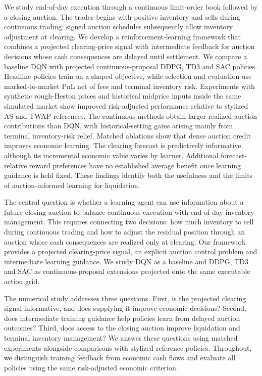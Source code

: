We study end-of-day execution through a continuous limit-order book followed
by a closing auction. The trader begins with positive inventory and sells
during continuous trading; signed auction schedules subsequently allow
inventory adjustment at clearing. We develop a reinforcement-learning framework
that combines a projected clearing-price signal with intermediate feedback
for auction decisions whose cash consequences are delayed until settlement.
We compare a baseline DQN with projected continuous-proposal DDPG, TD3 and SAC
policies. Headline policies train on a shaped objective, while selection and
evaluation use marked-to-market PnL net of fees and terminal inventory risk.
Experiments with synthetic rough-Heston prices and historical midprice inputs
inside the same simulated market show improved risk-adjusted performance
relative to stylized AS and TWAP references. The continuous methods obtain
larger realized auction contributions than DQN, with historical-setting gains
arising mainly from terminal inventory-risk relief. Matched ablations show
that dense auction credit improves economic learning. The clearing forecast
is predictively informative, although its incremental economic value varies
by learner. Additional forecast-relative reward preferences have no established
average benefit once learning guidance is held fixed. These findings identify
both the usefulness and the limits of auction-informed learning for liquidation.

The central question is whether a learning agent can use information about a
future closing auction to balance continuous execution with end-of-day inventory
management. This requires connecting two decisions: how much inventory to sell
during continuous trading and how to adjust the residual position through an
auction whose cash consequences are realized only at clearing. Our framework
provides a projected clearing-price signal, an explicit auction control problem
and intermediate learning guidance. We study DQN as a baseline and DDPG, TD3
and SAC as continuous-proposal extensions projected onto the same executable
action grid.

The numerical study addresses three questions. First, is the projected clearing
signal informative, and does supplying it improve economic decisions? Second,
does intermediate training guidance help policies learn from delayed auction
outcomes? Third, does access to the closing auction improve liquidation and
terminal inventory management? We answer these questions using matched
experiments alongside comparisons with stylized reference policies. Throughout,
we distinguish training feedback from economic cash flows and evaluate all
policies using the same risk-adjusted economic criterion.

